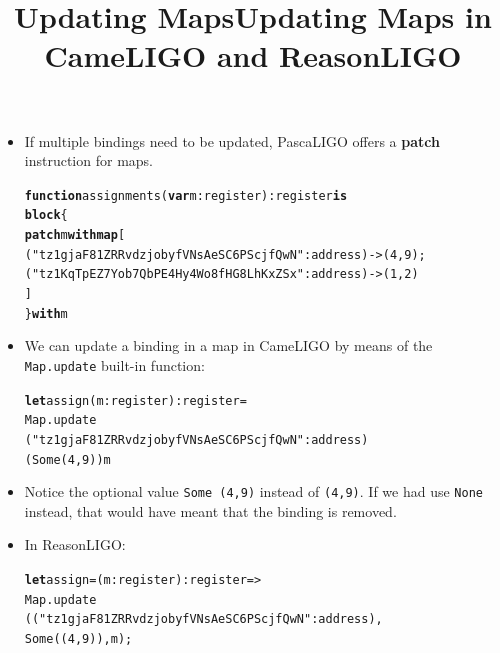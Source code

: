 \documentclass[wide]{slides}
\newcommand{\Kblock}[0]{\textbf{block}\xspace}
\newcommand{\Kfunction}[0]{\textbf{function}\xspace}
\newcommand{\Kis}[0]{\textbf{is}\xspace}
\newcommand{\Kmap}[0]{\textbf{map}\xspace}
\newcommand{\Kpatch}[0]{\textbf{patch}\xspace}
\newcommand{\Kvar}[0]{\textbf{var}\xspace}
\newcommand{\Kwith}[0]{\textbf{with}\xspace}
\newcommand{\Klet}[0]{\textbf{let}\xspace}
\begin{document}
\begin{slide}
  \title{Updating Maps}

  \begin{itemize}

    \item If multiple bindings need to be updated, PascaLIGO offers a
      \textbf{patch} instruction for maps.
      \begin{alltt}
\Kfunction assignments (\Kvar m : register) : register \Kis
  \Kblock \{
    \Kpatch m \Kwith \Kmap [
      ("tz1gjaF81ZRRvdzjobyfVNsAeSC6PScjfQwN" : address) -> (4,9);
      ("tz1KqTpEZ7Yob7QbPE4Hy4Wo8fHG8LhKxZSx" : address) -> (1,2)
    ]
  \} \Kwith m
      \end{alltt}

  \end{itemize}

\end{slide}

\begin{slide}
  \title{Updating Maps in CameLIGO and ReasonLIGO}

  \begin{itemize}

    \item We can update a binding in a map in CameLIGO by means of the
      \texttt{Map.update} built-in function:
      \begin{alltt}
\Klet assign (m : register) : register =
  Map.update
    ("tz1gjaF81ZRRvdzjobyfVNsAeSC6PScjfQwN" : address)
    (Some (4,9)) m
      \end{alltt}

    \item Notice the optional value \texttt{Some (4,9)} instead of
      \texttt{(4,9)}. If we had use \texttt{None} instead, that would
      have meant that the binding is removed.

    \item In ReasonLIGO:
      \begin{alltt}
\Klet assign = (m : register) : register =>
  Map.update
    (("tz1gjaF81ZRRvdzjobyfVNsAeSC6PScjfQwN" : address),
      Some ((4,9)), m);
      \end{alltt}

  \end{itemize}

\end{slide}
\end{document}
